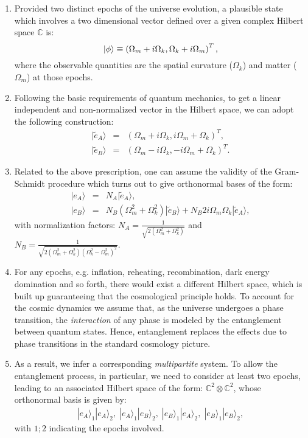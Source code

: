 \documentclass[nofootinbib,prd,superscriptaddress,showpacs,showkeys,]{revtex4}
\begin{document}
\begin{enumerate}
  \item Provided two distinct epochs of the universe evolution, a plausible state which involves a two dimensional vector defined over a given complex Hilbert space $\mathbb{C}$ is:
\begin{equation}\label{phi}
 |\phi\rangle\equiv \left(
\Omega_{m}+i\Omega_{k},\\
\Omega_{k}+i\Omega_{m}\right)^T,
\end{equation}
where the observable quantities  are the spatial curvature ($\Omega_{k}$) and matter ($\Omega_m$) at those epochs.




  \item Following the basic requirements of quantum mechanics,  to get a linear independent and non-normalized vector in the  Hilbert space, we can adopt the following construction:
\begin{eqnarray}
|\tilde e_A\rangle&=&\left(
\Omega_{m}+i\Omega_{k},
i\Omega_{m}+\Omega_{k}\right)^T, \\
|\tilde e_B\rangle&=&\left(
\Omega_{m}-i\Omega_{k},
-i\Omega_{m}+\Omega_{k}\right)^T.
\end{eqnarray}


  \item Related to the above prescription, one can assume the validity of the Gram-Schmidt procedure which turns out to give orthonormal bases of the form:
\begin{eqnarray}
|e_A\rangle&=&
N_A |\tilde e_A\rangle,\label{ortho1}\\
|e_B\rangle&=&
N_B (\Omega_m^2+\Omega_k^2) |\tilde e_B\rangle
+N_B 2i\Omega_m\Omega_k |\tilde e_A\rangle,
\label{ortho2}
\end{eqnarray}
with normalization factors: $N_A=\frac{1}{\sqrt{2(\Omega_m^2+\Omega_k^2)}}$ and $N_B=\frac{1}{\sqrt{2(\Omega_m^2+\Omega_k^2)(\Omega_k^2-\Omega_m^2)^2}}$.

\item For any epochs, e.g. inflation, reheating, recombination, dark energy domination and so forth,  there would exist a different Hilbert space, which is built up guaranteeing that the cosmological principle holds. To account for the cosmic dynamics we assume that, as the universe undergoes a phase transition, the \emph{interaction} of any phase is modeled by the entanglement between quantum states. Hence,   entanglement replaces the effects due to phase transitions in the standard cosmology picture.

\item  As a result, we infer a corresponding \emph{multipartite} system. To allow the entanglement process, in particular, we need to consider at least two epochs, leading to an associated Hilbert space of the form: $\mathbb{C}^2\otimes \mathbb{C}^2$, whose orthonormal basis is given by:
\begin{eqnarray}
 |e_A\rangle_{1} |e_A\rangle_{2},\;
  |e_A\rangle_{1} |e_B\rangle_{2},\;
   |e_B\rangle_{1} |e_A\rangle_{2},\;
    |e_B\rangle_{1} |e_B\rangle_{2},
 \label{basis}
\end{eqnarray}
with $1;2$ indicating the epochs involved.
\end{enumerate}
\end{document}
